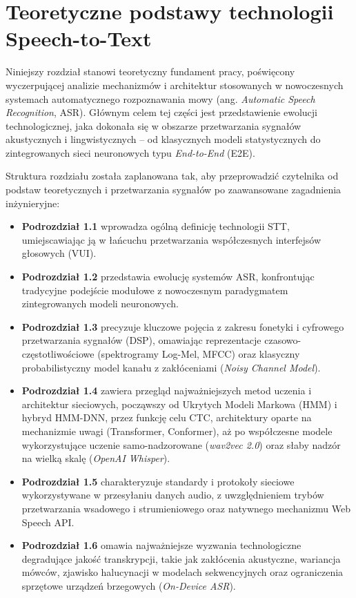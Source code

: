 \section{Teoretyczne podstawy technologii Speech-to-Text}
Niniejszy rozdział stanowi teoretyczny fundament pracy, poświęcony wyczerpującej analizie mechanizmów i architektur stosowanych w nowoczesnych systemach automatycznego rozpoznawania mowy (ang. \textit{Automatic Speech Recognition}, ASR). Głównym celem tej części jest przedstawienie ewolucji technologicznej, jaka dokonała się w obszarze przetwarzania sygnałów akustycznych i lingwistycznych -- od klasycznych modeli statystycznych do zintegrowanych sieci neuronowych typu \textit{End-to-End} (E2E).

Struktura rozdziału została zaplanowana tak, aby przeprowadzić czytelnika od podstaw teoretycznych i przetwarzania sygnałów po zaawansowane zagadnienia inżynieryjne:
\begin{itemize}
    \item \textbf{Podrozdział 1.1} wprowadza ogólną definicję technologii STT, umiejscawiając ją w łańcuchu przetwarzania współczesnych interfejsów głosowych (VUI).
    \item \textbf{Podrozdział 1.2} przedstawia ewolucję systemów ASR, konfrontując tradycyjne podejście modułowe z nowoczesnym paradygmatem zintegrowanych modeli neuronowych.
    \item \textbf{Podrozdział 1.3} precyzuje kluczowe pojęcia z zakresu fonetyki i cyfrowego przetwarzania sygnałów (DSP), omawiając reprezentacje czasowo-częstotliwościowe (spektrogramy Log-Mel, MFCC) oraz klasyczny probabilistyczny model kanału z zakłóceniami (\textit{Noisy Channel Model}).
    \item \textbf{Podrozdział 1.4} zawiera przegląd najważniejszych metod uczenia i architektur sieciowych, począwszy od Ukrytych Modeli Markowa (HMM) i hybryd HMM-DNN, przez funkcję celu CTC, architektury oparte na mechanizmie uwagi (Transformer, Conformer), aż po współczesne modele wykorzystujące uczenie samo-nadzorowane (\textit{wav2vec 2.0}) oraz słaby nadzór na wielką skalę (\textit{OpenAI Whisper}).
    \item \textbf{Podrozdział 1.5} charakteryzuje standardy i protokoły sieciowe wykorzystywane w przesyłaniu danych audio, z uwzględnieniem trybów przetwarzania wsadowego i strumieniowego oraz natywnego mechanizmu Web Speech API.
    \item \textbf{Podrozdział 1.6} omawia najważniejsze wyzwania technologiczne degradujące jakość transkrypcji, takie jak zakłócenia akustyczne, wariancja mówców, zjawisko halucynacji w modelach sekwencyjnych oraz ograniczenia sprzętowe urządzeń brzegowych (\textit{On-Device ASR}).
\end{itemize}

